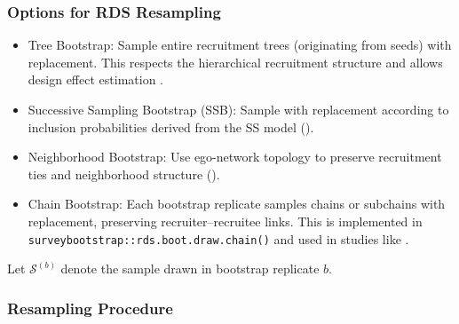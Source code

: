 \documentclass[
  12pt,
  letterpaper,
  DIV=11,
  numbers=noendperiod]{scrartcl}
\providecommand{\tightlist}{%
  \setlength{\itemsep}{0pt}\setlength{\parskip}{0pt}}
\theoremstyle{plain}
\theoremstyle{definition}
\begin{document}
\subsubsection{Options for RDS
Resampling}\label{options-for-rds-resampling}

\begin{itemize}
\tightlist
\item
  Tree Bootstrap: Sample entire recruitment trees (originating from
  seeds) with replacement. This respects the hierarchical recruitment
  structure and allows design effect estimation
  \autocite{salg06-variance}.
\item
  Successive Sampling Bootstrap (SSB): Sample with replacement according
  to inclusion probabilities derived from the SS model
  (\textcite{gile11-improved}).
\item
  Neighborhood Bootstrap: Use ego-network topology to preserve
  recruitment ties and neighborhood structure
  (\textcite{yauc22-neighborhood}).
\item
  Chain Bootstrap: Each bootstrap replicate samples chains or subchains
  with replacement, preserving recruiter--recruitee links. This is
  implemented in \texttt{surveybootstrap::rds.boot.draw.chain()} and
  used in studies like \textcite{weir12-comparison}.
\end{itemize}

Let \(\mathcal{S}^{(b)}\) denote the sample drawn in bootstrap replicate
\(b\).

\subsubsection{Resampling Procedure}\label{resampling-procedure}
\end{document}
